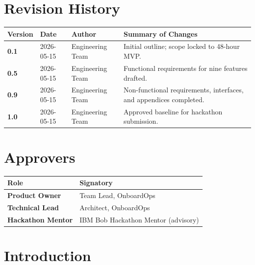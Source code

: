 \documentclass[11pt,letterpaper]{article}
\begin{document}
\section*{Revision History}

\renewcommand{\arraystretch}{1.3}
\begin{tabularx}{\textwidth}{>{\bfseries}l l l X}
\toprule
Version & Date & Author & Summary of Changes \\
\midrule
0.1 & 2026-05-15 & Engineering Team & Initial outline; scope locked to 48-hour MVP. \\
0.5 & 2026-05-15 & Engineering Team & Functional requirements for nine features drafted. \\
0.9 & 2026-05-15 & Engineering Team & Non-functional requirements, interfaces, and appendices completed. \\
1.0 & 2026-05-15 & Engineering Team & Approved baseline for hackathon submission. \\
\bottomrule
\end{tabularx}
\renewcommand{\arraystretch}{1.0}

\vspace{1em}

\section*{Approvers}

\begin{tabularx}{\textwidth}{>{\bfseries}l X}
\toprule
Role & Signatory \\
\midrule
Product Owner & Team Lead, OnboardOps \\
Technical Lead & Architect, OnboardOps \\
Hackathon Mentor & IBM Bob Hackathon Mentor (advisory) \\
\bottomrule
\end{tabularx}

\newpage

{\hypersetup{linkcolor=ibmdark}\tableofcontents}
\newpage

\section{Introduction}
\end{document}
